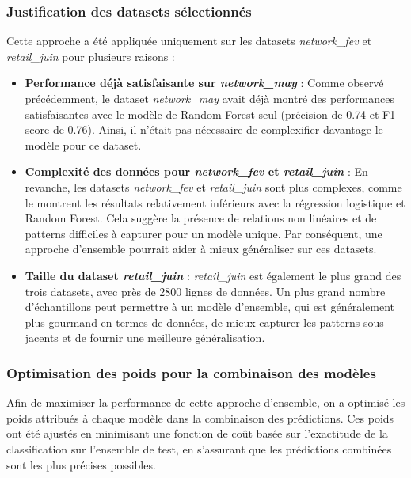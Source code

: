 \subsubsection{Justification des datasets sélectionnés}

Cette approche a été appliquée uniquement sur les datasets \textit{network\_fev} et \textit{retail\_juin} pour plusieurs raisons :

\begin{itemize}
    \item \textbf{Performance déjà satisfaisante sur \textit{network\_may}} : Comme observé précédemment, le dataset \textit{network\_may} avait déjà montré des performances satisfaisantes avec le modèle de Random Forest seul (précision de 0.74 et F1-score de 0.76). Ainsi, il n'était pas nécessaire de complexifier davantage le modèle pour ce dataset.
    \item \textbf{Complexité des données pour \textit{network\_fev} et \textit{retail\_juin}} : En revanche, les datasets \textit{network\_fev} et \textit{retail\_juin} sont plus complexes, comme le montrent les résultats relativement inférieurs avec la régression logistique et Random Forest. Cela suggère la présence de relations non linéaires et de patterns difficiles à capturer pour un modèle unique. Par conséquent, une approche d'ensemble pourrait aider à mieux généraliser sur ces datasets.
    \item \textbf{Taille du dataset \textit{retail\_juin}} : \textit{retail\_juin} est également le plus grand des trois datasets, avec près de 2800 lignes de données. Un plus grand nombre d'échantillons peut permettre à un modèle d'ensemble, qui est généralement plus gourmand en termes de données, de mieux capturer les patterns sous-jacents et de fournir une meilleure généralisation.
\end{itemize}

\subsubsection{Optimisation des poids pour la combinaison des modèles}

Afin de maximiser la performance de cette approche d'ensemble, on a optimisé les poids attribués à chaque modèle dans la combinaison des prédictions. Ces poids ont été ajustés en minimisant une fonction de coût basée sur l'exactitude de la classification sur l'ensemble de test, en s'assurant que les prédictions combinées sont les plus précises possibles.

